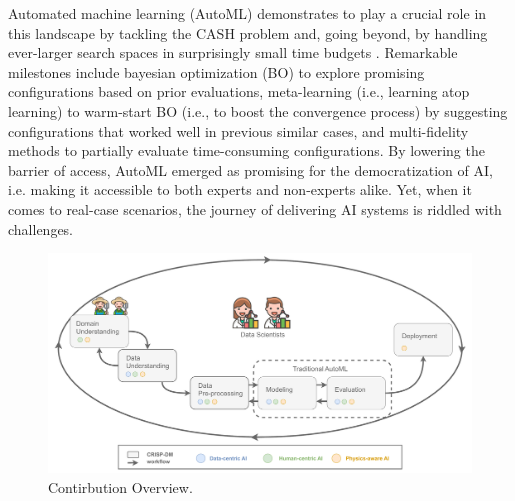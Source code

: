 Automated machine learning (AutoML) demonstrates to play a crucial role in this landscape by tackling the CASH problem and, going beyond, by handling ever-larger search spaces in surprisingly small time budgets \cite{small_time_budgets}.
Remarkable milestones include bayesian optimization (BO) to explore promising configurations based on prior evaluations,
meta-learning (i.e., learning atop learning) to warm-start BO (i.e., to boost the convergence process) by suggesting configurations that worked well in previous similar cases, and multi-fidelity methods to partially evaluate time-consuming configurations.
By lowering the barrier of access, AutoML emerged as promising for the democratization of AI, i.e. making it accessible to both experts and non-experts alike.
Yet, when it comes to real-case scenarios, the journey of
delivering AI systems is riddled with challenges.

\begin{figure}
    \centering
    \includegraphics[scale=0.3]{chapters/introduction/img/contribution_overview.pdf}
    \caption{Contirbution Overview.}
    \label{fig:contribution}
\end{figure}

